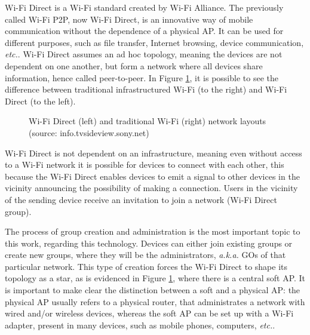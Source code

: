 Wi-Fi Direct is a Wi-Fi standard created by Wi-Fi Alliance. The previously called Wi-Fi P2P, now Wi-Fi Direct, is an innovative way of mobile communication without the dependence of a physical AP. It can be used for different purposes, such as file transfer, Internet browsing, device communication, \textit{etc.}. Wi-Fi Direct assumes an ad hoc topology, meaning the devices are not dependent on one another, but form a network where all devices share information, hence called peer-to-peer. In Figure \ref{fig:wifidirnet}, it is possible to see the difference between traditional infrastructured Wi-Fi (to the right) and Wi-Fi Direct (to the left).

\begin{figure}[ht]
	\noindent{}
	\caption{\label{fig:wifidirnet} Wi-Fi Direct (left) and traditional Wi-Fi (right) network layouts (source: info.tvsideview.sony.net)}
\end{figure}

Wi-Fi Direct is not dependent on an infrastructure, meaning even without access to a Wi-Fi network it is possible for devices to connect with each other, this because the Wi-Fi Direct enables devices to emit a signal to other devices in the vicinity announcing the possibility of making a connection. Users in the vicinity of the sending device receive an invitation to join a network (Wi-Fi Direct group).

The process of group creation and administration is the most important topic to this work, regarding this technology. Devices can either join existing groups or create new groups, where they will be the administrators, \textit{a.k.a.} \glspl{GO} of that particular network. This type of creation forces the Wi-Fi Direct to shape its topology as a star, as is evidenced in Figure \ref{fig:wifidirnet}, where there is a central soft \gls{AP}. It is important to make clear the distinction between a soft and a physical \gls{AP}: the physical \gls{AP} usually refers to a physical router, that administrates a network with wired and/or wireless devices, whereas the soft \gls{AP} can be set up with a Wi-Fi adapter, present in many devices, such as mobile phones, computers, \textit{etc.}.

